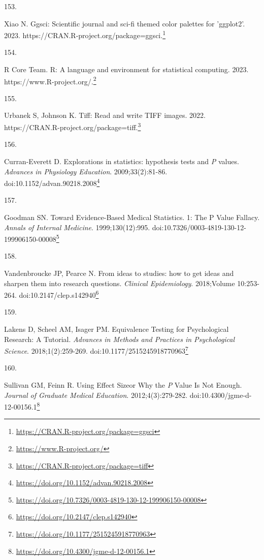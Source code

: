 \documentclass[
  a4paper,
]{book}
\newlength{\cslhangindent}
\newlength{\csllabelwidth}
\newlength{\cslentryspacingunit} %
\newenvironment{CSLReferences}[2] %
 {%
  \setlength{\parindent}{0pt}
  \ifodd #1
  \let\oldpar\par
  \def\par{\hangindent=\cslhangindent\oldpar}
  \fi
  \setlength{\parskip}{#2\cslentryspacingunit}
 }%
 {}
\newcommand{\CSLLeftMargin}[1]{\parbox[t]{\csllabelwidth}{#1}}
\newcommand{\CSLRightInline}[1]{\parbox[t]{\linewidth - \csllabelwidth}{#1}\break}
\renewcommand{\href}[2]{#2\footnote{\url{#1}}}
\begin{document}
\begin{CSLReferences}{0}{0}
\leavevmode{}%
\CSLLeftMargin{153. }%
\CSLRightInline{Xiao N. Ggsci: Scientific journal and sci-fi themed color palettes for 'ggplot2'. 2023. \href{https://CRAN.R-project.org/package=ggsci}{https://CRAN.R-project.org/package=ggsci.}}

\leavevmode{}%
\CSLLeftMargin{154. }%
\CSLRightInline{R Core Team. R: A language and environment for statistical computing. 2023. \href{https://www.R-project.org/}{https://www.R-project.org/.}}

\leavevmode{}%
\CSLLeftMargin{155. }%
\CSLRightInline{Urbanek S, Johnson K. Tiff: Read and write TIFF images. 2022. \href{https://CRAN.R-project.org/package=tiff}{https://CRAN.R-project.org/package=tiff.}}

\leavevmode{}%
\CSLLeftMargin{156. }%
\CSLRightInline{Curran-Everett D. Explorations in statistics: hypothesis tests and {\emph{P}} values. \emph{Advances in Physiology Education}. 2009;33(2):81-86. doi:\href{https://doi.org/10.1152/advan.90218.2008}{10.1152/advan.90218.2008}}

\leavevmode{}%
\CSLLeftMargin{157. }%
\CSLRightInline{Goodman SN. Toward Evidence-Based Medical Statistics. 1: The P Value Fallacy. \emph{Annals of Internal Medicine}. 1999;130(12):995. doi:\href{https://doi.org/10.7326/0003-4819-130-12-199906150-00008}{10.7326/0003-4819-130-12-199906150-00008}}

\leavevmode{}%
\CSLLeftMargin{158. }%
\CSLRightInline{Vandenbroucke JP, Pearce N. From ideas to studies: how to get ideas and sharpen them into research questions. \emph{Clinical Epidemiology}. 2018;Volume 10:253-264. doi:\href{https://doi.org/10.2147/clep.s142940}{10.2147/clep.s142940}}

\leavevmode{}%
\CSLLeftMargin{159. }%
\CSLRightInline{Lakens D, Scheel AM, Isager PM. Equivalence Testing for Psychological Research: A Tutorial. \emph{Advances in Methods and Practices in Psychological Science}. 2018;1(2):259-269. doi:\href{https://doi.org/10.1177/2515245918770963}{10.1177/2515245918770963}}

\leavevmode{}%
\CSLLeftMargin{160. }%
\CSLRightInline{Sullivan GM, Feinn R. Using Effect Size{\textemdash}or Why the {\emph{P}} Value Is Not Enough. \emph{Journal of Graduate Medical Education}. 2012;4(3):279-282. doi:\href{https://doi.org/10.4300/jgme-d-12-00156.1}{10.4300/jgme-d-12-00156.1}}


\end{CSLReferences}
\end{document}

